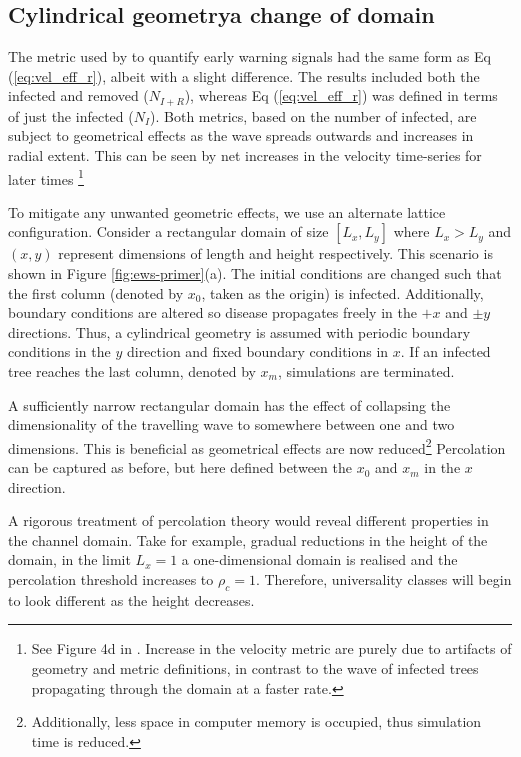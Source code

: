 \subsection{Cylindrical geometry\textemdash a change of domain}

The metric used by \cite{OROZCOFUENTES201912} to quantify early warning signals had the same form as Eq (\ref{eq:vel_eff_r}), albeit with a slight difference. %
The results included both the infected and removed ($N_{I+R}$), whereas Eq (\ref{eq:vel_eff_r}) %
was defined in terms of just the infected ($N_I$). %
Both metrics, based on the number of infected, are subject to geometrical effects as the wave %
spreads outwards and increases in radial extent. %
This can be seen by net increases in the velocity time-series for later times %
\footnote{See Figure 4d in \cite{OROZCOFUENTES201912}. Increase in the velocity metric are purely due to artifacts of geometry and metric definitions, in contrast to the wave of infected trees propagating through the domain at a faster rate.}

To mitigate any unwanted geometric effects, %
we use an alternate lattice configuration. %
Consider a rectangular domain of size $[L_x, L_y]$ where $L_x>L_y$ and $(x, y)$ represent dimensions %
of length and height respectively. This scenario is shown in Figure \ref{fig:ews-primer}(a). %
The initial conditions are changed such that the first column (denoted by $x_0$, taken as the origin) is infected. %
Additionally, boundary conditions are altered so disease propagates freely in the $+x$ and $\pm y$ directions. %
Thus, a cylindrical geometry is assumed with periodic boundary conditions in the $y$ direction and fixed boundary conditions in $x$. %
If an infected tree reaches the last column, denoted by $x_m$, simulations are terminated. %

A sufficiently narrow rectangular domain has the effect of collapsing the dimensionality of the travelling wave to somewhere between one and two dimensions. %
This is beneficial as geometrical effects are now reduced\footnote{Additionally, less space in computer memory is occupied, thus simulation time is reduced.} %
Percolation can be captured as before, but here defined between the $x_0$ and $x_m$ in the $x$ direction. %

A rigorous treatment of percolation theory would reveal different properties in the channel domain. %
Take for example, gradual reductions in the height of the domain, in the limit $L_x = 1$ a one-dimensional domain is realised and the percolation threshold increases to $\rho_c=1$. %
Therefore, universality classes will begin to look different as the height decreases. %


